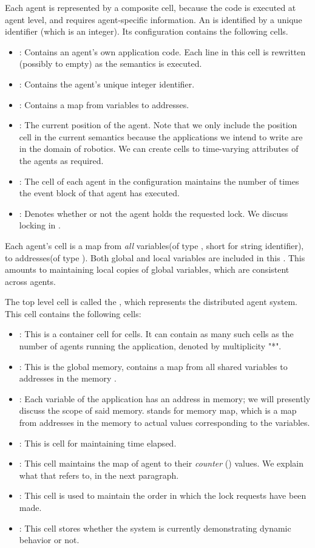 Each agent is represented by a composite cell, because the code is executed at agent level, and requires agent-specific information. An  is identified by a unique identifier  (which is an integer). Its configuration contains the following cells. 
\begin{itemize}
 \item  {} : Contains an agent's own application code. Each line in this cell is rewritten (possibly to empty) as the semantics is executed.
 \item {} : Contains the agent's unique integer identifier. 
 \item {} : Contains a map from variables to addresses. 
 \item  {} : The current position of the agent. Note that we only include the position cell in the current semantics because the applications we intend to write are in the domain of robotics. We can create cells to time-varying attributes of the agents as required.  
 \item  {} : The  cell of each agent in the configuration maintains the number of times the event block of that agent has executed.
 \item {} : Denotes whether or not the agent holds the requested lock. We discuss locking in . 
\end{itemize}

 Each agent's  cell is a map from \emph{all} variables(of type , short for string identifier), to addresses(of type ). Both global and local variables are included in this . This amounts to maintaining local copies of global variables, which are consistent across agents.  
 
The top level cell is called the , which represents the distributed agent system. This cell contains the following cells:
\begin{itemize}
\item {} : This is a container cell for  cells. It can contain as many such cells as the number of agents running the application, denoted by multiplicity "*". 
\item {} : This is the global memory, contains a map from all shared variables to addresses in the memory . 
\item {} : Each variable of the application has an address in memory; we will presently discuss the scope of said memory.  stands for memory map, which is a map from addresses in the memory to actual values corresponding to the variables. 
\item  {} : This is cell for maintaining time elapsed. 
\item {} : This cell maintains the map of agent  to their \emph{counter} () values. We explain what that refers to, in the next paragraph. 
\item  {}: This cell is used to maintain the order in which the lock requests have been made.
\item {} : This cell stores whether the system is currently demonstrating dynamic behavior or not.  
\end{itemize}

